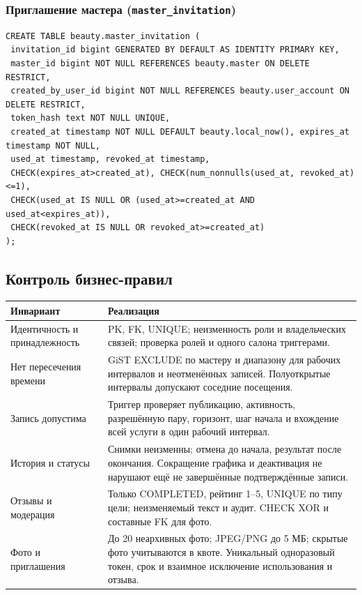 \documentclass[11pt,a4paper]{article}
\begin{document}
\par\medskip\noindent\begin{minipage}{\linewidth}
\subsubsection*{Приглашение мастера (\texttt{master\_\allowbreak{}invitation})}
\begin{lstlisting}[style=sql]
CREATE TABLE beauty.master_invitation (
 invitation_id bigint GENERATED BY DEFAULT AS IDENTITY PRIMARY KEY,
 master_id bigint NOT NULL REFERENCES beauty.master ON DELETE RESTRICT,
 created_by_user_id bigint NOT NULL REFERENCES beauty.user_account ON DELETE RESTRICT,
 token_hash text NOT NULL UNIQUE,
 created_at timestamp NOT NULL DEFAULT beauty.local_now(), expires_at timestamp NOT NULL,
 used_at timestamp, revoked_at timestamp,
 CHECK(expires_at>created_at), CHECK(num_nonnulls(used_at, revoked_at)<=1),
 CHECK(used_at IS NULL OR (used_at>=created_at AND used_at<expires_at)),
 CHECK(revoked_at IS NULL OR revoked_at>=created_at)
);
\end{lstlisting}
\end{minipage}\par\medskip
\subsection{Контроль бизнес-правил}


\begin{longtable}{L{4.1cm}L{12.0cm}}
\toprule Инвариант & Реализация\\\midrule\endhead
Идентичность и принадлежность & PK, FK, UNIQUE; неизменность роли и владельческих связей; проверка ролей и одного салона триггерами.\\
Нет пересечения времени & GiST EXCLUDE по мастеру и диапазону для рабочих интервалов и неотменённых записей. Полуоткрытые интервалы допускают соседние посещения.\\
Запись допустима & Триггер проверяет публикацию, активность, разрешённую пару, горизонт, шаг начала и вхождение всей услуги в один рабочий интервал.\\
История и статусы & Снимки неизменны; отмена до начала, результат после окончания. Сокращение графика и деактивация не нарушают ещё не завершённые подтверждённые записи.\\
Отзывы и модерация & Только COMPLETED, рейтинг 1--5, UNIQUE по типу цели; неизменяемый текст и аудит. CHECK XOR и составные FK для фото.\\
Фото и приглашения & До 20 неархивных фото; JPEG/PNG до 5 МБ; скрытые фото учитываются в квоте. Уникальный одноразовый токен, срок и взаимное исключение использования и отзыва.\\
\bottomrule\end{longtable}
\end{document}
